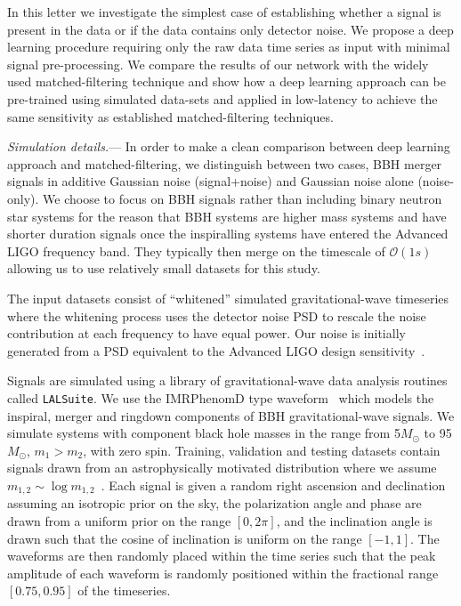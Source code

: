 \documentclass[%
showpacs,
 amsmath,amssymb,
 aps,
 twocolumn,
 prl,
 reprint,
floatfix,
]{revtex4-1}
\begin{document}
%
%
In this letter we investigate the simplest case of establishing whether a
signal is present in the data or if the data contains only detector noise. We
propose a deep learning procedure requiring only the raw data time series as
input with minimal signal pre-processing. We compare the results of our network
with the widely used matched-filtering technique and show how a deep learning
approach can be pre-trained using simulated data-sets and applied in
low-latency to achieve the same sensitivity as established matched-filtering
techniques. 

%
%
\textit{Simulation details.}--- 
%
%
In order to make a clean comparison between deep learning approach and
matched-filtering, we distinguish between two cases, \ac{BBH} merger
signals in additive Gaussian noise (signal+noise) and Gaussian noise alone
(noise-only). We choose to focus on \ac{BBH} signals rather than including
binary neutron star systems for the reason that \ac{BBH} systems are higher
mass systems and have shorter duration signals once the inspiralling systems
have entered the Advanced LIGO frequency band. They typically then merge on the
timescale of $\mathcal{O}(1 s)$ allowing us to use relatively small datasets
for this study. 

%
%
The input datasets consist of ``whitened'' simulated gravitational-wave
timeseries where the whitening process uses the detector noise \ac{PSD} to  
rescale the noise contribution at each frequency to have equal power. 
Our noise is initially generated from a \ac{PSD} equivalent to the Advanced
LIGO design sensitivity~\cite{2016LRR....19....1A}. 

%
%
Signals are simulated using a library of gravitational-wave data analysis
routines called \texttt{LALSuite}. We use the IMRPhenomD type
waveform~\cite{PhysRevD.93.044006, PhysRevD.93.044007} which models the
inspiral, merger and ringdown components of \ac{BBH} gravitational-wave
signals. We simulate systems with component black hole masses in the range from
5\(M_\odot\) to 95\(M_\odot\), $m_{1} > m_{2}$, with zero spin.
Training, validation and testing datasets contain signals drawn from an
astrophysically motivated distribution where we assume
$m_{1,2}\sim\log{m_{1,2}}$~\cite{PhysRevX.6.041015}. Each signal is given a
random right ascension and declination assuming an isotropic prior on the sky,
the polarization angle and phase are drawn from a uniform prior on the range
$[0,2\pi]$, and the inclination angle is drawn such that the cosine of
inclination is uniform on the range $[-1,1]$. The waveforms are then randomly
placed within the time series such that the peak amplitude of each waveform is
randomly positioned within the fractional range $[0.75,0.95]$ of the
timeseries. 
\end{document}
